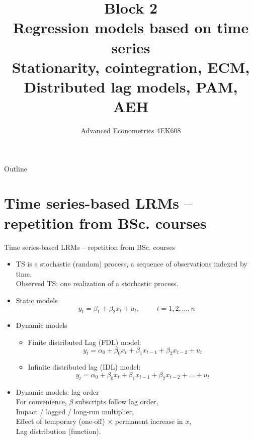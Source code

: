 \documentclass{beamer}
\title[Block 2]{Block 2 \\  Regression models based on time series\\ Stationarity, cointegration, ECM,\\ Distributed lag models, PAM, AEH}
\author{Advanced Econometrics 4EK608}
\institute{Vysoká škola ekonomická v Praze}
\date{}
\begin{document}
 \begin{frame}
  \titlepage
\end{frame}
\begin{frame}{Outline}
  \tableofcontents
\end{frame}
\section{Time series-based LRMs -- repetition from BSc. courses}
\small
\begin{frame}{Time series-based LRMs -- repetition from BSc. courses}
\begin{itemize}
  \item TS is a stochastic (random) process, a sequence of observations indexed by time. \\Observed TS: one realization of a stochastic process.
  \medskip
  \item Static models
  $$ y_t = \beta_1 + \beta_2 x_t + u_t , \hspace{1cm} t = 1, 2,  \dots, n $$
  \item Dynamic models
  \begin{itemize}
     \item Finite distributed Lag (FDL) model:
     $$ y_t = \alpha_0 + \beta_0 x_t + \beta_1 x_{t-1} + \beta_2 x_{t-2} + u_t $$
     \item Infinite distributed lag (IDL) model:
     $$ y_t = \alpha_0 + \beta_0 x_t + \beta_1 x_{t-1} + \beta_2 x_{t-2} + \dots + u_t $$
  \end{itemize}
  \item   Dynamic models: lag order\\ For convenience, $\beta$ subscripts follow lag order, \\
  Impact / lagged / long-run multiplier, \\
  Effect of temporary (one-off) $\times$ permanent increase in $x$, \\
  Lag distribution (function).
\end{itemize}
\end{frame}
\end{document}
